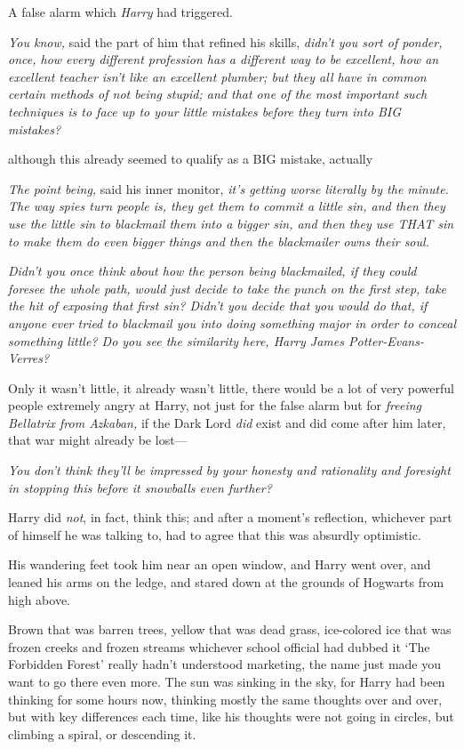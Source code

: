 A false alarm which \emph{Harry} had triggered.

\emph{You know,} said the part of him that refined his skills, \emph{didn't you
sort of ponder, once, how every different profession has a different way to be
excellent, how an excellent teacher isn't like an excellent plumber; but they
all have in common certain methods of not being stupid; and that one of the
most important such techniques is to face up to your little mistakes before
they turn into BIG mistakes?}

{\el} although this already seemed to qualify as a BIG mistake,
actually{\el}

\emph{The point being,} said his inner monitor, \emph{it's getting worse
literally by the minute. The way spies turn people is, they get them to commit
a little sin, and then they use the little sin to blackmail them into a bigger
sin, and then they use THAT sin to make them do even bigger things and then the
blackmailer owns their soul.}

\emph{Didn't you once think about how the person being blackmailed, if they
could foresee the whole path, would just decide to take the punch on the first
step, take the hit of exposing that first sin? Didn't you decide that you would
do that, if anyone ever tried to blackmail you into doing something major in
order to conceal something little? Do you see the similarity here, Harry James
Potter-Evans-Verres?}

Only it wasn't little, it already wasn't little, there would be a lot of very
powerful people extremely angry at Harry, not just for the false alarm but for
\emph{freeing Bellatrix from Azkaban,} if the Dark Lord \emph{did} exist and
did come after him later, that war might already be lost---

\emph{You don't think they'll be impressed by your honesty and rationality and
foresight in stopping this before it snowballs even further?}

Harry did \emph{not}, in fact, think this; and after a moment's reflection,
whichever part of himself he was talking to, had to agree that this was
absurdly optimistic.

His wandering feet took him near an open window, and Harry went over, and
leaned his arms on the ledge, and stared down at the grounds of Hogwarts from
high above.

Brown that was barren trees, yellow that was dead grass, ice-colored ice that
was frozen creeks and frozen streams{\el} whichever school official had
dubbed it `The Forbidden Forest' really hadn't understood marketing, the name
just made you want to go there even more. The sun was sinking in the sky, for
Harry had been thinking for some hours now, thinking mostly the same thoughts
over and over, but with key differences each time, like his thoughts were not
going in circles, but climbing a spiral, or descending it.

